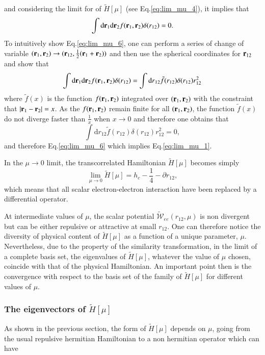 \documentclass[aip,jcp,reprint,noshowkeys,superscriptaddress]{revtex4-1}
\newcommand{\br}[0]{{\bf {r}}}
\begin{document}
and considering the limit for of $\tilde{H}[\mu]$ (see Eq.\eqref{eq:lim_mu_4}), it implies that 
\begin{equation}
 \label{eq:lim_mu_6}
 \int \text{d}\br{}_1 \text{d}\br{}_2 f(\br{}_1,\br{}_2) \delta(r_{12}) = 0.
\end{equation}
To intuitively show Eq.\eqref{eq:lim_mu_6}, one can perform a series of change of variable $(\br{}_1,\br{}_2)\rightarrow (\br{}_{12},\frac{1}{2}(\br{}_1 + \br{}_2))$ and then use the spherical coordinates for $\br{}_{12}$ and show that 
\begin{equation}
 \int \text{d}\br{}_1 \text{d}\br{}_2 f(\br{}_1,\br{}_2) \delta(r_{12}) = \int \text{d}r{}_{12}  \tilde{f}(r_{12}) \delta(r_{12}) r_{12}^2 
\end{equation}
where $\tilde{f}(x)$ is the function $f(\br{}_1,\br{}_2)$ integrated over $(\br{}_1,\br{}_2)$ with the constraint that 
$|\br{}_1-\br{}_2| = x$. 
As the $f(\br{}_1,\br{}_2)$ remain finite for all $(\br{}_1,\br{}_2)$, the function $\tilde{f}(x)$ 
do not diverge faster than $\frac{1}{x}$ when $x\rightarrow 0$ and therefore one obtains that 
\begin{equation}
 \int \text{d}r{}_{12}  \tilde{f}(r_{12}) \delta(r_{12}) r_{12}^2 = 0,
\end{equation}
and therefore Eq.\eqref{eq:lim_mu_6} which implies Eq.\eqref{eq:lim_mu_1}. 

In the $\mu \rightarrow 0$ limit, the transcorrelated Hamiltonian $\tilde{H}[\mu]$ becomes simply 
\begin{equation}
 \lim_{\mu \rightarrow 0} \tilde{H}[\mu] = h_c - \frac{1}{4} - \partial{}{r_{12}}{}, 
\end{equation}
which means that all scalar electron-electron interaction have been replaced by a differential operator. 

At intermediate values of $\mu$, the scalar potential $\tilde{\mathcal{W}}_{ee}(r_{12},\mu) $ is non divergent but can be either repulsive or attractive at small $r_{12}$. One can therefore notice the diversity of physical content of $\tilde{H}[\mu]$ as a function of a unique parameter, $\mu$. 
Nevertheless, due to the property of the similarity transformation, in the limit of a complete basis set, the eigenvalues of $\tilde{H}[\mu]$, whatever the value of $\mu$ chosen, coincide with that of the physical Hamiltonian. An important point then is the convergence with respect to the basis set of the family of $\tilde{H}[\mu]$ for different values of $\mu$.  

\subsubsection{The eigenvectors of $\tilde{H}[\mu]$}
As shown in the previous section, the form of $\tilde{H}[\mu]$ depends on $\mu$, going from the usual repulsive hermitian Hamiltonian to a non hermitian operator which can have   
\end{document}

